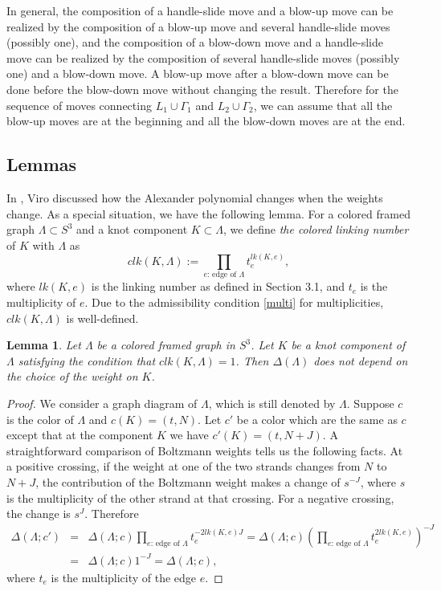 \documentclass[12pt]{amsart}
\newtheorem{lemma}[theo]{Lemma}
\begin{document}
In general, the composition of a handle-slide move and a blow-up move can be realized by the composition of a blow-up move and several handle-slide moves (possibly one), and the composition of a blow-down move and a handle-slide move can be realized by the composition of several handle-slide moves (possibly one) and a blow-down move. A blow-up move after a blow-down move can be done before the blow-down move without changing the result. Therefore for the sequence of moves connecting $L_1\cup \Gamma_1$ and $L_2 \cup \Gamma_2$, we can assume that all the blow-up moves are at the beginning and all the blow-down moves are at the end.


\subsection{Lemmas}
In \cite[7.5]{MR2255851}, Viro discussed how the Alexander polynomial changes when the weights change. As a special situation, we have the following lemma. For a colored framed graph $\Lambda \subset S^3$ and a knot component $K\subset \Lambda$, we define {\it the colored linking number} of $K$ with $\Lambda$ as 
$$clk(K, \Lambda):=\prod_{\text{$e$: edge of $\Lambda$}}t_e^{lk(K, e)},$$
where $lk(K, e)$ is the linking number as defined in Section 3.1, and $t_e$ is the multiplicity of $e$. Due to the admissibility condition \eqref{multi} for multiplicities, $clk(K, \Lambda)$ is well-defined.

\begin{lemma}
\label{zero}
Let $\Lambda$ be a colored framed graph in $S^3$. Let $K$ be a knot component of $\Lambda$ satisfying the condition that $clk(K, \Lambda)=1$. Then $\Delta (\Lambda)$ does not depend on the choice of the weight on $K$.
\end{lemma}
\begin{proof}
We consider a graph diagram of $\Lambda$, which is still denoted by $\Lambda$. Suppose $c$ is the color of $\Lambda$ and $c(K)=(t, N)$. Let $c'$ be a color which are the same as $c$ except that at the component $K$ we have $c'(K)=(t, N+J)$. A straightforward comparison of Boltzmann weights tells us the following facts. At a positive crossing, if the weight at one of the two strands changes from $N$ to $N+J$, the contribution of the Boltzmann weight makes a change of $s^{-J}$, where $s$ is the multiplicity of the other strand at that crossing. For a negative crossing, the change is $s^{J}$. Therefore
\begin{eqnarray*} 
\Delta (\Lambda; c')&=&\Delta (\Lambda; c)\prod_{\text{$e$: edge of $\Lambda$}} t_e^{-2lk(K, e)J}=\Delta (\Lambda; c)\left (\prod_{\text{$e$: edge of $\Lambda$}} t_e^{2lk(K, e)}\right )^{-J}\\&=&\Delta (\Lambda; c)1^{-J}=\Delta (\Lambda; c),
\end{eqnarray*}
where $t_e$ is the multiplicity of the edge $e$.
\end{proof}
\end{document}
